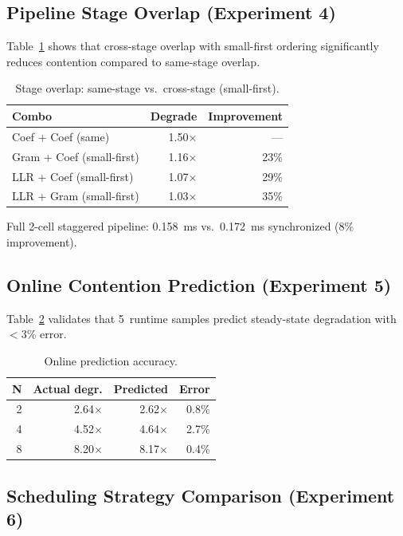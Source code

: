 \subsection{Pipeline Stage Overlap (Experiment 4)}

Table~\ref{tab:eval_pipeline} shows that cross-stage overlap with small-first ordering significantly reduces contention compared to same-stage overlap.

\begin{table}[h]
\centering
\small
\caption{Stage overlap: same-stage vs.\ cross-stage (small-first).}
\label{tab:eval_pipeline}
\begin{tabular}{@{}lrr@{}}
\toprule
Combo & Degrade & Improvement \\
\midrule
Coef + Coef (same) & 1.50$\times$ & --- \\
Gram + Coef (small-first) & 1.16$\times$ & 23\% \\
LLR + Coef (small-first) & 1.07$\times$ & 29\% \\
LLR + Gram (small-first) & 1.03$\times$ & 35\% \\
\bottomrule
\end{tabular}
\end{table}

Full 2-cell staggered pipeline: 0.158~ms vs.\ 0.172~ms synchronized (8\% improvement).

\subsection{Online Contention Prediction (Experiment 5)}

Table~\ref{tab:eval_online} validates that 5~runtime samples predict steady-state degradation with $<$3\% error.

\begin{table}[h]
\centering
\small
\caption{Online prediction accuracy.}
\label{tab:eval_online}
\begin{tabular}{@{}rrrr@{}}
\toprule
N & Actual degr. & Predicted & Error \\
\midrule
2 & 2.64$\times$ & 2.62$\times$ & 0.8\% \\
4 & 4.52$\times$ & 4.64$\times$ & 2.7\% \\
8 & 8.20$\times$ & 8.17$\times$ & 0.4\% \\
\bottomrule
\end{tabular}
\end{table}

\subsection{Scheduling Strategy Comparison (Experiment 6)}

